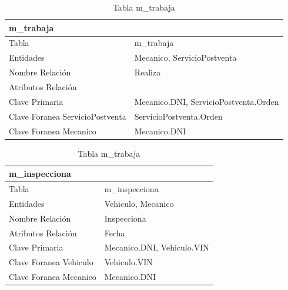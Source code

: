 \documentclass[12pt]{article}
\begin{document}
\begin{table}[h]
    \begin{center}
        \begin{tabular}{|l|l|}
            \multicolumn{2}{l}{\textbf{m\_trabaja}} \\
            \hline
            Tabla & m\_trabaja \\ \hline        
            Entidades & Mecanico, ServicioPostventa \\ \hline
            Nombre Relación & Realiza \\ \hline
            Atributos Relación &  \\ \hline
            Clave Primaria & Mecanico.DNI, ServicioPostventa.Orden \\ \hline
            Clave Foranea ServicioPostventa & ServicioPostventa.Orden \\ \hline
            Clave Foranea Mecanico & Mecanico.DNI \\
            \hline
            \end{tabular}
        \caption{Tabla m\_trabaja}
    \end{center}
\end{table}

\begin{table}[h]
    \begin{center}
        \begin{tabular}{|l|l|}
            \multicolumn{2}{l}{\textbf{m\_inspecciona}} \\
            \hline
            Tabla & m\_inspecciona \\ \hline        
            Entidades & Vehiculo, Mecanico \\ \hline
            Nombre Relación & Inspecciona \\ \hline
            Atributos Relación & Fecha \\ \hline
            Clave Primaria & Mecanico.DNI, Vehiculo.VIN \\ \hline
            Clave Foranea Vehiculo & Vehiculo.VIN \\ \hline
            Clave Foranea Mecanico & Mecanico.DNI \\
            \hline
            \end{tabular}
        \caption{Tabla m\_trabaja}
    \end{center}
\end{table}
\end{document}
